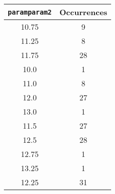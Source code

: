 \documentclass[letterpaper, 12pt]{article}
\begin{document}
\begin{longtable}{|c|c|}
\hline
\textbf{\texttt{paramparam2}} & \textbf{Occurrences} \\
\hline
10.75 & 9 \\
\hline
11.25 & 8 \\
\hline
11.75 & 28 \\
\hline
10.0 & 1 \\
\hline
11.0 & 8 \\
\hline
12.0 & 27 \\
\hline
13.0 & 1 \\
\hline
11.5 & 27 \\
\hline
12.5 & 28 \\
\hline
12.75 & 1 \\
\hline
13.25 & 1 \\
\hline
12.25 & 31 \\
\hline
\end{longtable}
\end{document}
